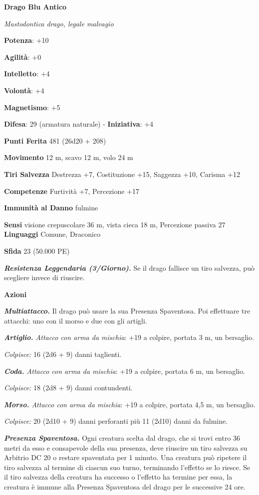 \begin{multicols}{2}
\textbf{Drago Blu Antico}

\emph{Mastodontica drago, legale malvagio}

\textbf{Potenza}: +10

\textbf{Agilità}: +0

\textbf{Intelletto}: +4

\textbf{Volontà}: +4

\textbf{Magnetismo}: +5

\textbf{Difesa}: 29 (armatura naturale) - \textbf{Iniziativa}: +4

\textbf{Punti Ferita} 481 (26d20 + 208)

\textbf{Movimento} 12 m, scavo 12 m, volo 24 m

\textbf{Tiri Salvezza} Destrezza +7, Costituzione +15, Saggezza +10,
Carisma +12

\textbf{Competenze} Furtività +7, Percezione +17

\textbf{Immunità al Danno} fulmine

\textbf{Sensi} visione crepuscolare 36 m, vista cieca 18 m, Percezione passiva
27 \textbf{Linguaggi} Comune, Draconico

\textbf{Sfida} 23 (50.000 PE)\smallskip

\emph{\textbf{Resistenza Leggendaria (3/Giorno).}} Se il drago fallisce
un tiro salvezza, può scegliere invece di riuscire.

\smallskip\textbf{Azioni}

\emph{\textbf{Multiattacco.}} Il drago può usare la sua Presenza
Spaventosa. Poi effettuare tre attacchi: uno con il morso e due con gli
artigli.

\emph{\textbf{Artiglio.} Attacco con arma da mischia}: +19 a colpire,
portata 3 m, un bersaglio.

\emph{Colpisce:} 16 (2d6 + 9) danni taglienti.

\emph{\textbf{Coda.} Attacco con arma da mischia}: +19 a colpire,
portata 6 m, un bersaglio.

\emph{Colpisce:} 18 (2d8 + 9) danni contundenti.

\emph{\textbf{Morso.} Attacco con arma da mischia}: +19 a colpire,
portata 4,5 m, un bersaglio.

\emph{Colpisce:} 20 (2d10 + 9) danni perforanti più 11 (2d10) danni da
fulmine.

\emph{\textbf{Presenza Spaventosa.}} Ogni creatura scelta dal drago, che
si trovi entro 36 metri da esso e consapevole della sua presenza, deve
riuscire un tiro salvezza su Arbitrio DC 20 o restare spaventata per 1
minuto. Una creatura può ripetere il tiro salvezza al termine di ciascun
suo turno, terminando l'effetto se lo riesce. Se il tiro salvezza della
creatura ha successo o l'effetto ha termine per essa, la creatura è
immune alla Presenza Spaventosa del drago per le successive 24 ore.


\end{multicols}
